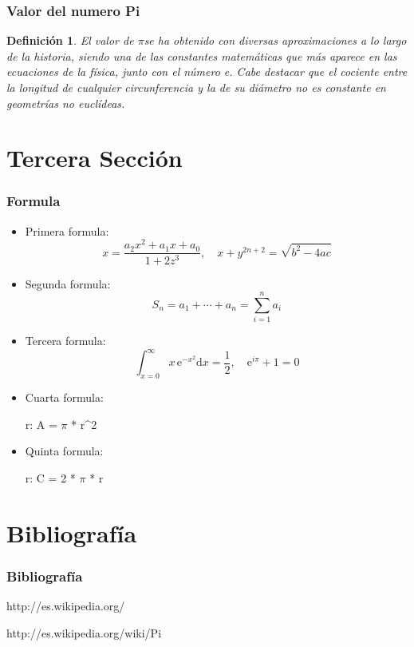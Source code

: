 \documentclass{beamer}
\newtheorem{definicion}{Definición}
\begin{document}
\begin{frame}

\frametitle{Valor del numero Pi}
\begin{definicion}
El valor de $\pi$se ha obtenido con diversas aproximaciones a lo largo de la historia, siendo una 
de las constantes matemáticas que más aparece en las ecuaciones de la física, junto con el número e. 
Cabe destacar que el cociente entre la longitud de cualquier circunferencia y la de su diámetro 
no es constante en geometrías no euclídeas.
\end{definicion}

\end{frame}
\section{Tercera Sección}
  \begin{frame}
    \frametitle{Formula}
      \begin{itemize}
	\item
	  Primera formula:
	  \[ 
	  x=\frac{a_2 x^2 + a_1 x + a_0}{1+2z^3}, 
	  \quad x+y^{2n+2}=\sqrt{b^2-4ac}
	  \]
	\pause

	\item
	  Segunda formula:
	  \[ S_n=a_1+\cdots + a_n = \sum_{i=1}^n a_i \]
	\pause

	\item
	  Tercera formula:
	  \[
	  \int_{x=0}^{\infty} x\,\text{e}^{-x^2}
	  \text{d}x=\frac{1}{2},\quad\text{e}^{i\pi}+1=0
	  \]
	\pause
	
	\item
	  Cuarta formula:
	  
	   r: A = $\pi$ * r^2
	\pause
  
	\item
	  Quinta formula:
	  
	  r: C = 2 * $\pi$ * r
	  
	\pause
      \end{itemize}
  \end{frame}


\section{Bibliografía}
\begin{frame}
  \frametitle{Bibliografía}

  \begin{thebibliography}{10}
    \beamertemplatebookbibitems
  
    \beamertemplatebookbibitems
   
    {\small http://es.wikipedia.org/}

    {\small http://es.wikipedia.org/wiki/Pi}

  \end{thebibliography}
\end{frame}

\end{document}
